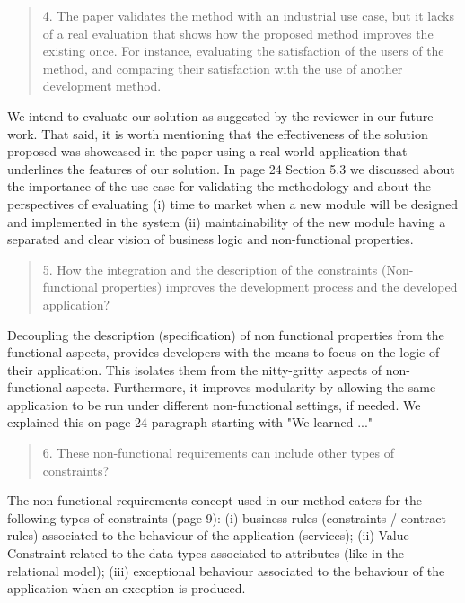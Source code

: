 \documentclass[12pt,a4wide]{article}
\begin{document}
\begin{quotation}\sf\footnotesize

4.    The paper validates the method with an industrial use case, but it lacks of a real evaluation that shows how the proposed method improves the existing once. For instance, evaluating the satisfaction of the users of the method, and comparing their satisfaction with the use of another development method. 
\end{quotation}

\noindent 
We intend to evaluate our solution as suggested by the reviewer in our future work. That said, it is worth mentioning that the effectiveness of the solution proposed was showcased in the paper using a real-world application that underlines the features of our solution. In page 24 Section 5.3  we discussed about the importance of the use case for validating the methodology and about the perspectives of evaluating (i) time to market when a new module will be designed and implemented in the system (ii) maintainability of the new module having a separated and clear vision of business logic and non-functional properties.

\begin{quotation}\sf\footnotesize

5.    How the integration and the description of the constraints (Non-functional properties) improves the development process and the developed application? 
\end{quotation}

\noindent 
Decoupling the description (specification) of non functional properties from the functional aspects, provides developers with the means to focus on the logic of their application. This isolates them from the nitty-gritty aspects of non-functional aspects. Furthermore, it improves modularity by allowing the same application to be run under different non-functional settings, if needed. We explained this on page 24 paragraph starting with "We learned ..."


\begin{quotation}\sf\footnotesize

6.    These non-functional requirements can include other types of constraints? 
\end{quotation}

\noindent 
The non-functional requirements concept used in our method caters for the following types of constraints (page 9): (i) business rules (constraints / contract rules) associated to the behaviour of the application (services); (ii) Value Constraint related to the data types associated to attributes (like in the relational model); (iii) exceptional behaviour associated to the behaviour of the application when an exception is produced. 
\end{document}
